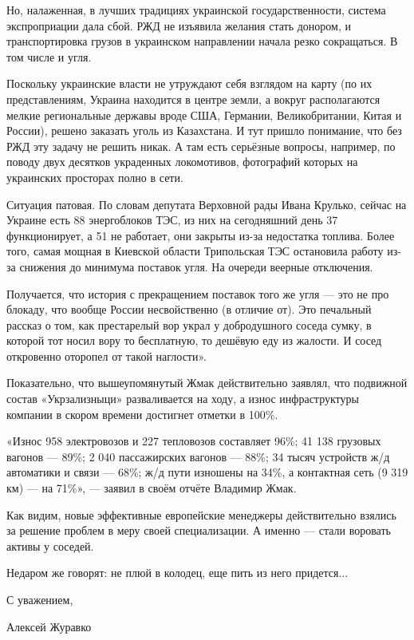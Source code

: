 Но, налаженная, в лучших традициях украинской государственности, система
экспроприации дала сбой. РЖД не изъявила желания стать донором, и
транспортировка грузов в украинском направлении начала резко сокращаться. В том
числе и угля.

Поскольку украинские власти не утруждают себя взглядом на карту (по их
представлениям, Украина находится в центре земли, а вокруг располагаются мелкие
региональные державы вроде США, Германии, Великобритании, Китая и России),
решено заказать уголь из Казахстана. И тут пришло понимание, что без РЖД эту
задачу не решить никак. А там есть серьёзные вопросы, например, по поводу двух
десятков украденных локомотивов, фотографий которых на украинских просторах
полно в сети.

Ситуация патовая. По словам депутата Верховной рады Ивана Крулько, сейчас на
Украине есть 88 энергоблоков ТЭС, из них на сегодняшний день 37 функционирует,
а 51 не работает, они закрыты из-за недостатка топлива. Более того, самая
мощная в Киевской области Трипольская ТЭС остановила работу из-за снижения до
минимума поставок угля. На очереди веерные отключения.

Получается, что история с прекращением поставок того же угля — это не про
блокаду, что вообще России несвойственно (в отличие от). Это печальный рассказ
о том, как престарелый вор украл у добродушного соседа сумку, в которой тот
носил вору то бесплатную, то дешёвую еду из жалости. И сосед откровенно
оторопел от такой наглости».

Показательно, что вышеупомянутый Жмак действительно заявлял, что подвижной
состав «Укрзализныци» разваливается на ходу, а износ инфраструктуры компании в
скором времени достигнет отметки в 100\%.

«Износ 958 электровозов и 227 тепловозов составляет 96\%; 41 138 грузовых
вагонов — 89\%; 2 040 пассажирских вагонов — 88\%; 34 тысяч устройств ж/д
автоматики и связи — 68\%; ж/д пути изношены на 34\%, а контактная сеть (9 319
км) — на 71\%», — заявил в своём отчёте Владимир Жмак.

Как видим, новые эффективные европейские менеджеры действительно взялись за
решение проблем в меру своей специализации. А именно — стали воровать активы у
соседей.

Недаром же говорят: не плюй в колодец, еще пить из него придется...

С уважением,

Алексей Журавко
